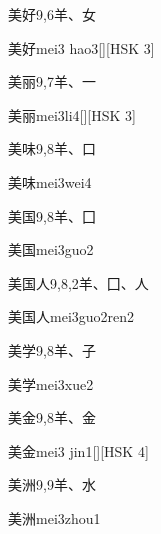 \begin{entry}{美好}{9,6}{⽺、⼥}
  \begin{phonetics}{美好}{mei3 hao3}[][HSK 3]
  \end{phonetics}
\end{entry}

\begin{entry}{美丽}{9,7}{⽺、⼀}
  \begin{phonetics}{美丽}{mei3li4}[][HSK 3]
  \end{phonetics}
\end{entry}

\begin{entry}{美味}{9,8}{⽺、⼝}
  \begin{phonetics}{美味}{mei3wei4}
  \end{phonetics}
\end{entry}

\begin{entry}{美国}{9,8}{⽺、⼞}
  \begin{phonetics}{美国}{mei3guo2}
  \end{phonetics}
\end{entry}

\begin{entry}{美国人}{9,8,2}{⽺、⼞、⼈}
  \begin{phonetics}{美国人}{mei3guo2ren2}
  \end{phonetics}
\end{entry}

\begin{entry}{美学}{9,8}{⽺、⼦}
  \begin{phonetics}{美学}{mei3xue2}
  \end{phonetics}
\end{entry}

\begin{entry}{美金}{9,8}{⽺、⾦}
  \begin{phonetics}{美金}{mei3 jin1}[][HSK 4]
  \end{phonetics}
\end{entry}

\begin{entry}{美洲}{9,9}{⽺、⽔}
  \begin{phonetics}{美洲}{mei3zhou1}
  \end{phonetics}
\end{entry}

